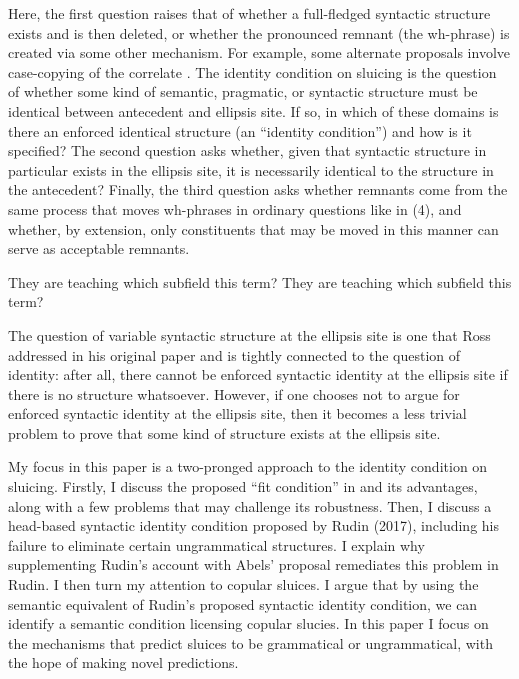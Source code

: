 \documentclass{turabian-researchpaper}
\begin{document}
\noindent Here, the first question raises that of whether a full-fledged syntactic structure exists and is then deleted, or whether the pronounced remnant (the wh-phrase) is created via some other mechanism. For example, some alternate proposals involve case-copying of the correlate \citep{manetta2013, chomsky1995principles}.  
The identity condition on sluicing is the question of whether some kind of semantic, pragmatic, or syntactic structure must be identical between antecedent and ellipsis site. If so, in which of these domains is there an enforced identical structure (an ``identity condition'') and how is it specified?  The second question asks whether, given that syntactic structure in particular exists in the ellipsis site, it is necessarily identical to the structure in the antecedent? Finally, the third question asks whether remnants come from the same process that moves wh-phrases in ordinary questions like in (4), and whether, by extension, only constituents that may be moved in this manner can serve as acceptable remnants.  

\begin{exe}
\ex\label{whichsubfield}
\begin{xlist}
\ex They are teaching which subfield this term? 
\ex They are teaching which subfield this term? 
\end{xlist}
\end{exe}

The question of variable syntactic structure at the ellipsis site is one that Ross addressed in his original paper and is tightly connected to the question of identity: after all, there cannot be enforced syntactic identity at the ellipsis site if there is no structure whatsoever. However, if one chooses not to argue for enforced syntactic identity at the ellipsis site, then it becomes a less trivial problem to prove that some kind of structure exists at the ellipsis site. 

My focus in this paper is a two-pronged approach to the identity condition on sluicing. 
Firstly, I discuss the proposed ``fit condition'' in \citet{abelsfitcondition} and its advantages, along with a few problems that may challenge its robustness. Then, I discuss a head-based syntactic identity condition proposed by Rudin (2017), including his failure to eliminate certain ungrammatical structures. I explain why supplementing Rudin's account with Abels' proposal remediates this problem in Rudin. I then turn my attention to copular sluices. I argue that by using the semantic equivalent of Rudin's proposed syntactic identity condition, we can identify a semantic condition licensing copular slucies. In this paper I focus on the mechanisms that predict sluices to be grammatical or ungrammatical, with the hope of making novel predictions.  
\end{document}
